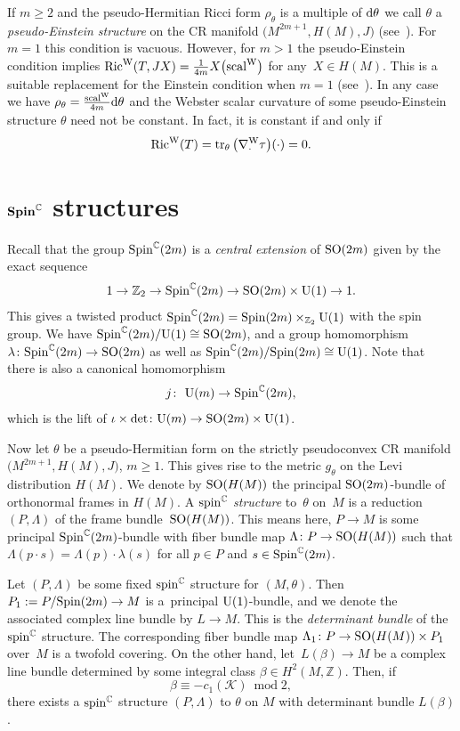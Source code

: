 \documentclass[pdftex]{sigma}
\numberwithin{equation}{section}
\newcommand{\ZZ}{\mathbb{Z}}
\newcommand{\CC}{\mathbb{C}}
\begin{document}
If $m\geq 2$ and the pseudo-Hermitian Ricci form $\rho_\theta$ is a multiple of ${\rm d}\theta$ we call $\theta$ a {\em pseudo-Einstein structure}
on the CR manifold $\big(M^{2m+1},H(M),J\big)$ (see~\cite{Lee}). For $m=1$ this condition is vacuous. However, for $m>1$ the pseudo-Einstein condition implies
 $\operatorname{Ric}^{\rm W}(T,JX)=\frac{1}{4m}X\big({\rm scal}^{\rm W}\big)$ for any~$X\in H(M)$. This is a suitable replacement for the Einstein condition when $m=1$ (see~\cite{CY}).
In any case we have $\rho_\theta=\frac{{\rm scal}^{\rm W}}{4m}{\rm d}\theta$ and the Webster scalar curvature of some pseudo-Einstein structure $\theta$
need not be constant. In fact, it
is constant if and only if
\[\operatorname{Ric}^{\rm W}(T) = \operatorname{tr}_\theta\big(\nabla^{\rm W}_{\cdot}\tau\big)(\cdot) = 0.\]

\section[Spin C structures]{$\boldsymbol{{\rm Spin}^\CC}$ structures} \label{Sec4}

Recall that the group ${\rm Spin}^\CC(2m)$ is a {\em central extension} of ${\rm SO}(2m)$ given by the exact sequence
\[
1 \to \ZZ_2 \to {\rm Spin}^\CC(2m) \to {\rm SO}(2m)\times {\rm U}(1) \to 1.
\]
This gives a twisted product ${\rm Spin}^\CC(2m)={\rm Spin}(2m)\times_{\ZZ_2}{\rm U}(1)$ with the spin group. We have
${\rm Spin}^\CC(2m)/{\rm U}(1)\cong {\rm SO}(2m)$, and a group homomorphism $\lambda\colon {\rm Spin}^\CC(2m)\to {\rm SO}(2m)$ as well as
${\rm Spin}^\CC(2m)/{\rm Spin}(2m)\cong {\rm U}(1)$. Note that there is also a canonical homomorphism
\[
j\colon \ {\rm U}(m) \to {\rm Spin}^{\CC}(2m),
\]
which is the lift of $\iota\times \det\colon {\rm U}(m)\to {\rm SO}(2m)\times {\rm U}(1)$.

Now let $\theta$ be a pseudo-Hermitian form on the strictly pseudoconvex CR manifold $\big(M^{2m+1},\allowbreak H(M),J\big)$, $m\geq 1$.
This gives rise to the metric $g_\theta$ on the Levi distribution $H(M)$.
We denote by ${\rm SO} (H(M))$ the principal ${\rm SO}(2m)$-bundle of orthonormal frames in $H(M)$.
A {\em ${\rm spin}^\CC$ structure} to~$\theta$ on~$M$ is a reduction
$(P,\Lambda)$ of the frame bundle~${\rm SO}(H(M))$. This means here, $P\to M$ is some principal ${\rm Spin}^\CC(2m)$-bundle with fiber bundle map
$\Lambda\colon P\to {\rm SO}(H(M))$
such that $\Lambda(p\cdot s)=\Lambda(p)\cdot \lambda(s)$ for all $p\in P$ and $s\in {\rm Spin}^\CC(2m)$.

Let $(P,\Lambda)$ be some fixed ${\rm spin}^\CC$ structure for $(M,\theta)$. Then $P_1:=P/{\rm Spin}(2m)\to M$ is a~principal ${\rm U}(1)$-bundle,
and we denote the associated complex line bundle by $L\to M$. This is the {\em determinant bundle} of the ${\rm spin}^\CC$ structure.
The corresponding fiber bundle map $\Lambda_1\colon P\to {\rm SO}(H(M))\times P_1$ over~$M$ is a twofold covering.
On the other hand, let~$L(\beta)\to M$ be a complex line bundle
determined by some integral class $\beta\in H^2(M,\ZZ)$. Then, if
\[
\beta \equiv -c_1(\mathcal{K}) \ \operatorname{mod} 2,
\]
there exists a ${\rm spin}^\CC$ structure $(P,\Lambda)$ to $\theta$ on $M$
with determinant bundle $L(\beta)$.
\end{document}
